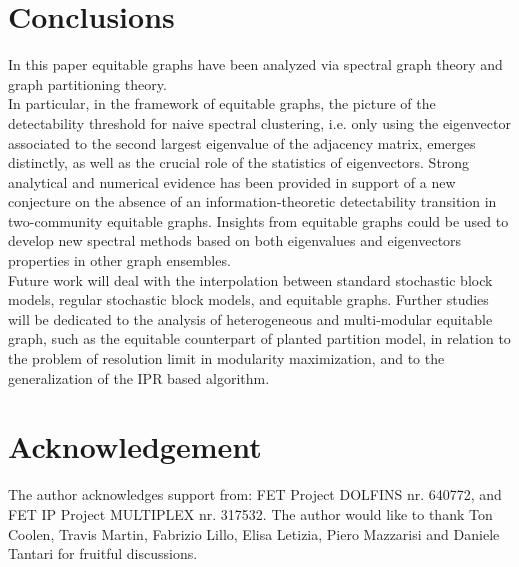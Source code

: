 \documentclass[%
 reprint,
 amsmath,amssymb,
 aps,
 pre,
 showpacs
]{revtex4-1}
\begin{document}
\section{\label{sec:con}Conclusions}

In this paper equitable graphs \cite{newman2014equitable} have been analyzed via spectral graph theory and graph partitioning theory. \\
In particular, in the framework of equitable graphs, the picture of the detectability threshold for naive spectral clustering, i.e. only using the eigenvector associated to the second largest eigenvalue of the adjacency matrix, emerges distinctly, as well as the crucial role of the statistics of eigenvectors. Strong analytical and numerical evidence has been provided in support of a new conjecture on the absence of an information-theoretic detectability transition in two-community equitable graphs.
Insights from equitable graphs could be used to develop new spectral methods based on both eigenvalues and eigenvectors properties in other graph ensembles.\\
Future work will deal with the interpolation between standard stochastic block models, regular stochastic block models, and equitable graphs. Further studies will be dedicated to the analysis of heterogeneous and multi-modular equitable graph, such as the equitable counterpart of planted partition model, in relation to the problem of resolution limit \cite{fortunato2007resolution} in modularity maximization, and to the generalization of the IPR based algorithm.

\section*{Acknowledgement}
The author acknowledges support from: FET Project DOLFINS nr. 640772, and FET IP Project MULTIPLEX nr. 317532.
The author would like to thank Ton Coolen, Travis Martin, Fabrizio Lillo, Elisa Letizia, Piero Mazzarisi and Daniele Tantari for fruitful discussions. 
\end{document}
